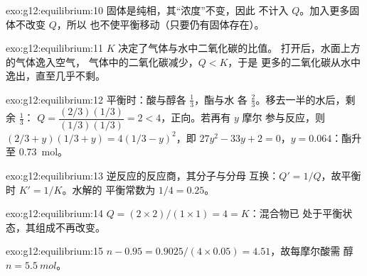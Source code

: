 \begin{solution}{exo:g12:equilibrium:10}
固体是纯相，其“浓度”不变，因此
不计入 $Q$。加入更多固体不改变 $Q$，所以
也不使平衡移动（只要仍有固体存在）。
\end{solution}

\begin{solution}{exo:g12:equilibrium:11}
$K$ 决定了气体与水中二氧化碳的比值。
打开后，水面上方的气体逸入空气，
气体中的二氧化碳减少，$Q < K$，于是
更多的二氧化碳从水中逸出，直至几乎不剩。
\end{solution}

\begin{solution}{exo:g12:equilibrium:12}
平衡时：酸与醇各 $\frac{1}{3}$，酯与水
各 $\frac{2}{3}$。移去一半的水后，剩余 $\frac{1}{3}$：
$Q = \dfrac{(2/3)(1/3)}{(1/3)(1/3)} = 2 < 4$，正向。若再有 $y$ 摩尔
参与反应，则 $(2/3 + y)(1/3 + y) = 4(1/3 - y)^2$，即
$27y^2 - 33y + 2 = 0$，$y = 0.064$：酯升至 \qty{0.73}{mol}。
\end{solution}

\begin{solution}{exo:g12:equilibrium:13}
逆反应的反应商，其分子与分母
互换：$Q' = 1/Q$，故平衡时 $K' = 1/K$。水解的
平衡常数为 $1/4 = 0.25$。
\end{solution}

\begin{solution}{exo:g12:equilibrium:14}
$Q = (2 \times 2)/(1 \times 1) = 4 = K$：混合物已
处于平衡状态，其组成不再改变。
\end{solution}

\begin{solution}{exo:g12:equilibrium:15}
$n - 0.95 = 0.9025 / (4 \times 0.05) = 4.51$，故每摩尔酸需
醇 $n = \qty{5.5}{mol}$。
\end{solution}

